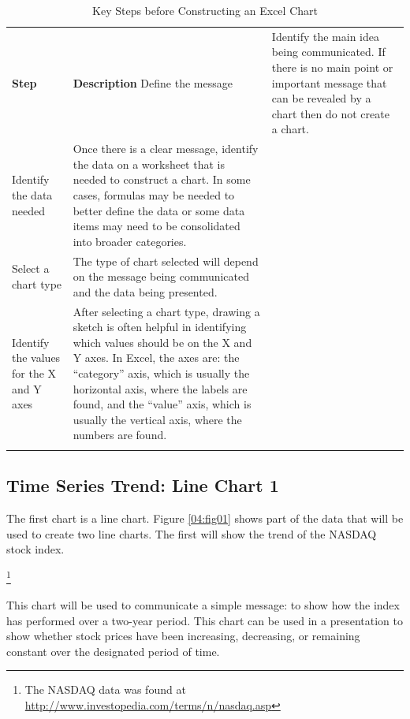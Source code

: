\begin{table}[H]
	{\small
		\begin{longtable}{L{0.75in}L{3.50in}} %
			\textbf{Step} & \textbf{Description} \endhead
			\hline
			Define the message & Identify the main idea being communicated. If there is no main point or important message that can be revealed by a chart then do not create a chart.\\
			Identify the data needed & Once there is a clear message, identify the data on a worksheet that is needed to construct a chart. In some cases, formulas may be needed to better define the data or some data items may need to be consolidated into broader categories.\\
			Select a chart type & The type of chart selected will depend on the message being communicated and the data being presented.\\
			Identify the values for the X and Y axes & After selecting a chart type, drawing a sketch is often helpful in identifying which values should be on the X and Y axes. In Excel, the axes are: the ``category'' axis, which is usually the horizontal axis, where the labels are found, and the ``value'' axis, which is usually the vertical axis, where the numbers are found.\\
			\caption{Key Steps before Constructing an Excel Chart}
			\label{04:tab01}
		\end{longtable}
	} %
\end{table}

\subsection{Time Series Trend: Line Chart 1}

The first chart is a line chart. Figure \ref{04:fig01} shows part of the data that will be used to create two line charts. The first will show the trend of the NASDAQ stock index.

\footnote{The NASDAQ data was found at \url{http://www.investopedia.com/terms/n/nasdaq.asp}}

This chart will be used to communicate a simple message: to show how the index has performed over a two-year period. This chart can be used in a presentation to show whether stock prices have been increasing, decreasing, or remaining constant over the designated period of time.

